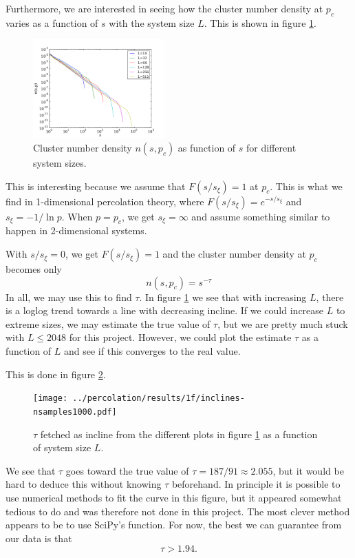 \documentclass[a4paper,reprint,floatfix,amsmath,amssymb,aps,pra]{revtex4-1}
\begin{document}
Furthermore, we are interested in seeing how the cluster number density at $p_c$ varies as a function of $s$ with the system size $L$. This is shown in figure \ref{fig:cluster-number-density-systemsize}.
%
\begin{figure}
  \centering
  \includegraphics[width=0.45\textwidth]{../percolation/results/1f/n-vs-s-nsamples10000.pdf}
  \caption{Cluster number density $n(s,p_c)$ as function of $s$ for different system sizes.}
  \label{fig:cluster-number-density-systemsize}
\end{figure}
%
This is interesting because we assume that $F(s/s_{\xi}) = 1$ at $p_c$. This is what we find in 1-dimensional percolation theory, where $F(s/s_{\xi}) = e^{-s/s_{\xi}}$ and $s_{\xi} = -1 / \ln p$. When $p=p_{c}$, we get $s_{\xi} = \infty$ and assume something similar to happen in 2-dimensional systems. 

With $s/s_{\xi} = 0$, we get $F(s/s_{\xi}) = 1$ and the cluster number density at $p_{c}$ becomes only
\begin{equation}
  n(s,p_{c}) = s^{-\tau}
\end{equation} 
In all, we may use this to find $\tau$. In figure \ref{fig:cluster-number-density-systemsize} we see that with increasing $L$, there is a loglog trend towards a line with decreasing incline. If we could increase $L$ to extreme sizes, we may estimate the true value of $\tau$, but we are pretty much stuck with $L \leq 2048$ for this project. However, we could plot the estimate $\tau$ as a function of $L$ and see if this converges to the real value. 

This is done in figure \ref{fig:tau-vs-systemsize}.
%
\begin{figure}
  \centering
  \texttt{[image: ../percolation/results/1f/inclines-nsamples1000.pdf]}
  \caption{$\tau$ fetched as incline from the different plots in figure \ref{fig:cluster-number-density-systemsize} as a function of system size $L$.}
  \label{fig:tau-vs-systemsize}
\end{figure}
%
We see that $\tau$ goes toward the true value of $\tau = 187/91 \approx 2.055$, but it would be hard to deduce this without knowing $\tau$ beforehand. In principle it is possible to use numerical methods to fit the curve in this figure, but it appeared somewhat tedious to do and was therefore not done in this project. The most clever method appears to be to use SciPy's  function. For now, the best we can guarantee from our data is that
\begin{equation}
  \tau > 1.94.
\end{equation} 
\end{document}
